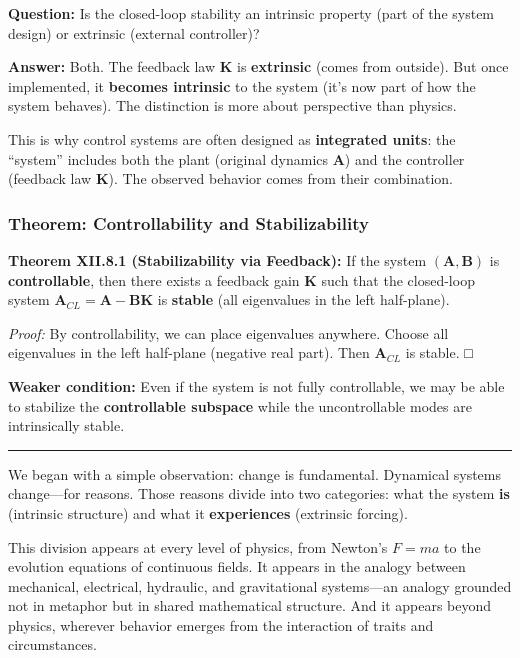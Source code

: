 \documentclass[
]{article}
\begin{document}
\textbf{Question:} Is the closed-loop stability an intrinsic property
(part of the system design) or extrinsic (external controller)?

\textbf{Answer:} Both. The feedback law \(\mathbf{K}\) is
\textbf{extrinsic} (comes from outside). But once implemented, it
\textbf{becomes intrinsic} to the system (it's now part of how the
system behaves). The distinction is more about perspective than physics.

This is why control systems are often designed as \textbf{integrated
units}: the ``system'' includes both the plant (original dynamics
\(\mathbf{A}\)) and the controller (feedback law \(\mathbf{K}\)). The
observed behavior comes from their combination.

\subsubsection{Theorem: Controllability and
Stabilizability}\label{theorem-controllability-and-stabilizability}

\textbf{Theorem XII.8.1 (Stabilizability via Feedback):} If the system
\((\mathbf{A}, \mathbf{B})\) is \textbf{controllable}, then there exists
a feedback gain \(\mathbf{K}\) such that the closed-loop system
\(\mathbf{A}_{CL} = \mathbf{A} - \mathbf{BK}\) is \textbf{stable} (all
eigenvalues in the left half-plane).

\emph{Proof:} By controllability, we can place eigenvalues anywhere.
Choose all eigenvalues in the left half-plane (negative real part). Then
\(\mathbf{A}_{CL}\) is stable. □

\textbf{Weaker condition:} Even if the system is not fully controllable,
we may be able to stabilize the \textbf{controllable subspace} while the
uncontrollable modes are intrinsically stable.

\begin{center}\rule{0.5\linewidth}{0.5pt}\end{center}

We began with a simple observation: change is fundamental. Dynamical
systems change---for reasons. Those reasons divide into two categories:
what the system \textbf{is} (intrinsic structure) and what it
\textbf{experiences} (extrinsic forcing).

This division appears at every level of physics, from Newton's
\(F = ma\) to the evolution equations of continuous fields. It appears
in the analogy between mechanical, electrical, hydraulic, and
gravitational systems---an analogy grounded not in metaphor but in
shared mathematical structure. And it appears beyond physics, wherever
behavior emerges from the interaction of traits and circumstances.
\end{document}
